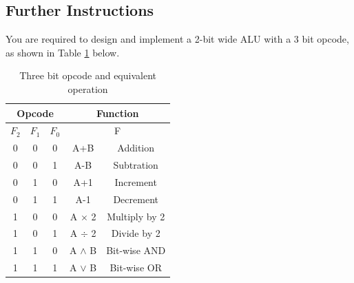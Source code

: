 \subsection{Further Instructions}
You are required to design and implement a 2-bit wide ALU with a 3 bit opcode, as shown in Table \ref{tbl:Opcodes} below.
\begin{table}[H]
\centering
\caption{Three bit opcode and equivalent operation}
\label{tbl:Opcodes}
\begin{tabular}{|c|c|c|c|c|}
\hline
\multicolumn{3}{|c|}{\textbf{Opcode}} & \multicolumn{2}{c|}{\textbf{Function}} \\ \hline
$F_2$ & $F_1$ & $F_0$ & \multicolumn{2}{c|}{F} \\ \hline
0 & 0 & 0 & A+B & Addition \\ \hline
0 & 0 & 1 & A-B & Subtration \\ \hline
0 & 1 & 0 & A+1 & Increment \\ \hline
0 & 1 & 1 & A-1 & Decrement \\ \hline
1 & 0 & 0 & A $\times$ 2 & Multiply by 2 \\ \hline
1 & 0 & 1 & A $\div$ 2 & Divide by 2 \\ \hline
1 & 1 & 0 & A $\wedge$ B & Bit-wise AND \\ \hline
1 & 1 & 1 & A $\vee$ B & Bit-wise OR \\ \hline
\end{tabular}%
\end{table}